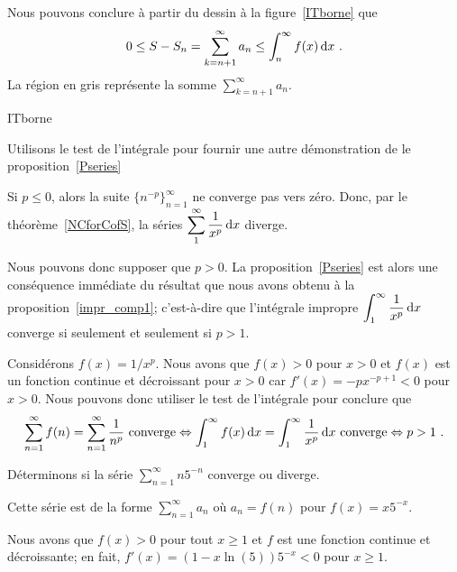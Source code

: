 {\begin{rmk}
Nous pouvons conclure à partir du dessin à la figure~\ref{ITborne} que
\[
0 \leq S - S_n = \sum_{k=n+1}^\infty a_n \leq \int_n^\infty f(x) \,\mathrm{d}x \ .
\]
La région en gris représente la somme
$\displaystyle \sum_{k=n+1}^\infty a_n$.
\end{rmk}

{ITborne}

\begin{egg}
Utilisons le test de l'intégrale pour fournir une autre
démonstration de le proposition~\ref{Pseries}

Si $p \leq 0$, alors la suite $\displaystyle \{n^{-p}\}_{n=1}^\infty$
ne converge pas vers zéro.  Donc, par le théorème~\ref{NCforCofS},
la séries $\displaystyle \sum_1^\infty \frac{1}{x^p} \,\mathrm{d}x$
diverge.

Nous pouvons donc supposer que $p>0$.  La proposition~\ref{Pseries} est alors
une conséquence immédiate du résultat que nous avons obtenu à
la proposition~\ref{impr_comp1}; c'est-à-dire que l'intégrale impropre
$\displaystyle \int_1^\infty \frac{1}{x^p} \,\mathrm{d}x$ converge si seulement et
seulement si $p>1$.

Considérons $f(x) = 1/x^p$.  Nous avons que $f(x)>0$ pour $x>0$ et
$f(x)$ est un fonction continue et décroissant pour $x>0$ car
$f'(x) = -p x^{-p+1} <0$ pour $x>0$.  Nous pouvons donc utiliser le test de
l'intégrale pour conclure que
\[
\sum_{n=1}^\infty f(n)= \sum_{n=1}^\infty \frac{1}{n^p}
\text{ converge} \Leftrightarrow 
\int_1^\infty f(x) \,\mathrm{d}x = \int_1^\infty \frac{1}{x^p} \,\mathrm{d}x
\text{ converge} \Leftrightarrow
p>1 \ .
\]
\end{egg}

\begin{egg}
Déterminons si la série $\displaystyle \sum_{n=1}^\infty n 5^{-n}$
converge ou diverge.

Cette série est de la forme $\displaystyle \sum_{n=1}^\infty a_n$ où
$a_n = f(n)$ pour $f(x) = x 5^{-x}$.

Nous avons que $f(x) > 0$ pour tout $x\geq 1$ et $f$ est une fonction
continue et décroissante; en fait,
$f'(x) = (1 - x\ln(5))5^{-x} < 0$ pour $x\geq 1$.


\end{egg}}
